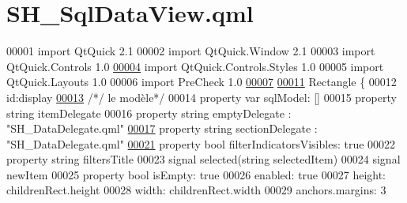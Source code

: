 \hypertarget{SH__SqlDataView_8qml}{\section{S\-H\-\_\-\-Sql\-Data\-View.\-qml}
\label{SH__SqlDataView_8qml}
}

\begin{DoxyCode}
00001 \textcolor{keyword}{import} QtQuick 2.1
00002 import QtQuick.Window 2.1
00003 import QtQuick.Controls 1.0
\hypertarget{SH__SqlDataView_8qml_source_l00004}{}\hyperlink{classSH__SqlDataView}{00004} import QtQuick.Controls.Styles 1.0
00005 import QtQuick.Layouts 1.0
00006 import PreCheck 1.0
\hypertarget{SH__SqlDataView_8qml_source_l00007}{}\hyperlink{classSH__SqlDataView_ad538d6f1dd43a7d01c7960a74ca131dc}{00007} 
\hypertarget{SH__SqlDataView_8qml_source_l00011}{}\hyperlink{classSH__SqlDataView_af2c0c75bb57606451699027fa74eeda2}{00011} Rectangle \{
00012     \textcolor{keywordtype}{id}:display
\hypertarget{SH__SqlDataView_8qml_source_l00013}{}\hyperlink{classSH__SqlDataView_a60486947b034f5fca72a2d5775ad1767}{00013}     \textcolor{comment}{/*/ le modèle*/}
00014     \textcolor{keyword}{property} var sqlModel: []
00015     \textcolor{keyword}{property} \textcolor{keywordtype}{string} itemDelegate
00016     \textcolor{keyword}{property} \textcolor{keywordtype}{string} emptyDelegate : \textcolor{stringliteral}{"SH\_DataDelegate.qml"}
\hypertarget{SH__SqlDataView_8qml_source_l00017}{}\hyperlink{classSH__SqlDataView_afdc0805dc2ce3af4e9ce5331a81d7e13}{00017}     \textcolor{keyword}{property} \textcolor{keywordtype}{string} sectionDelegate : \textcolor{stringliteral}{"SH\_DataDelegate.qml"}
\hypertarget{SH__SqlDataView_8qml_source_l00021}{}\hyperlink{classSH__SqlDataView_a3ceaf016d4dace986a92e2e77772bac9}{00021}     \textcolor{keyword}{property} \textcolor{keywordtype}{bool} filterIndicatorsVisibles: \textcolor{keyword}{true}
00022     \textcolor{keyword}{property} \textcolor{keywordtype}{string} filtersTitle
00023     signal selected(\textcolor{keywordtype}{string} selectedItem)
00024     signal newItem
00025     \textcolor{keyword}{property} \textcolor{keywordtype}{bool} isEmpty: \textcolor{keyword}{true}
00026     enabled: \textcolor{keyword}{true}
00027     height: childrenRect.height
00028     width: childrenRect.width
00029     anchors.margins: 3

\end{DoxyCode}
